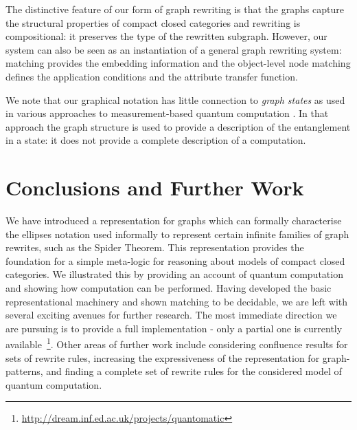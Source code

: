 \documentclass[runningheads]{llncs}
\begin{document}
The distinctive feature of our form of graph rewriting is that the
graphs capture the structural properties of compact closed categories
and rewriting is compositional: it preserves the type of the rewritten
subgraph. However, our system can also be seen as an instantiation of
a general graph rewriting system: matching provides the embedding
information and the object-level node matching defines the application
conditions and the attribute transfer function.

We note that our graphical notation has little connection
to \emph{graph states} as used in various approaches to
measurement-based quantum computation \cite{Raussendorf-2001}.  In
that approach the graph structure is used to provide a description of
the entanglement in a state:  it does not provide a complete
description of a computation.


\section{Conclusions and Further Work}
\label{sec:conclusions}

We have introduced a representation for graphs which can formally
characterise the ellipses notation used informally to represent
certain infinite families of graph rewrites, such as the Spider
Theorem.  This representation provides the foundation for a simple
meta-logic for reasoning about models of compact closed categories. We
illustrated this by providing an account of quantum computation and
showing how computation can be performed. Having developed the basic
representational machinery and shown matching to be decidable, we are
left with several exciting avenues for further research.  The most
immediate direction we are pursuing is to provide a full
implementation - only a partial one is currently
available~\footnote{\url{http://dream.inf.ed.ac.uk/projects/quantomatic}}.
Other areas of further work include considering confluence results for
sets of rewrite rules, increasing the expressiveness of the
representation for graph-patterns, and finding a complete set of
rewrite rules for the considered model of quantum computation.




\end{document}
